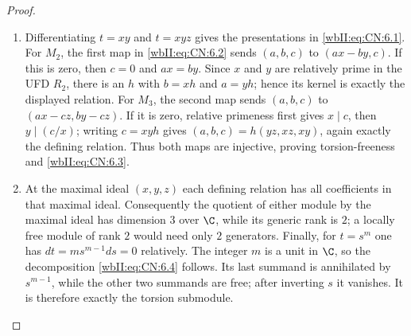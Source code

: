 \begin{proof}

\begin{enumerate}[label=\arabic*.,leftmargin=*]
\item Differentiating $t=xy$ and $t=xyz$ gives the presentations in \eqref{wbII:eq:CN:6.1}.  For
$M_2$, the first map in \eqref{wbII:eq:CN:6.2} sends $(a,b,c)$ to $(ax-by,c)$.  If this is
zero, then $c=0$ and $ax=by$.  Since $x$ and $y$ are relatively prime in the
UFD $R_2$, there is an $h$ with $b=xh$ and $a=yh$; hence its kernel is exactly
the displayed relation.  For $M_3$, the second map sends $(a,b,c)$ to
$(ax-cz,by-cz)$.  If it is zero, relative primeness first gives $x\mid c$,
then $y\mid(c/x)$; writing $c=xyh$ gives
$(a,b,c)=h(yz,xz,xy)$, again exactly the defining relation.  Thus both maps
are injective, proving torsion-freeness and \eqref{wbII:eq:CN:6.3}.

\item At the maximal ideal $(x,y,z)$ each defining relation has all coefficients in
that maximal ideal.  Consequently the quotient of either module by the
maximal ideal has dimension $3$ over $\C$, while its generic rank is $2$;
a locally free module of rank $2$ would need only $2$ generators.  Finally, for $t=s^m$ one has
$dt=m s^{m-1}ds=0$ relatively.  The integer $m$ is a unit in $\C$, so the
decomposition \eqref{wbII:eq:CN:6.4} follows.  Its last summand is annihilated by
$s^{m-1}$, while the other two summands are free; after inverting $s$ it
vanishes.  It is therefore exactly the torsion submodule.

\end{enumerate}
\end{proof}